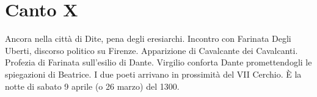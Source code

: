 \documentclass[10pt,a4paper]{article}
\begin{document}
	\section{Canto X}
	
	Ancora nella città di Dite, pena degli eresiarchi. Incontro con Farinata Degli Uberti, discorso politico su Firenze. Apparizione di Cavalcante dei Cavalcanti. Profezia di Farinata sull'esilio di Dante. Virgilio conforta Dante promettendogli le spiegazioni di Beatrice. I due poeti arrivano in prossimità del VII Cerchio.
	È la notte di sabato 9 aprile (o 26 marzo) del 1300.
	
\end{document}
